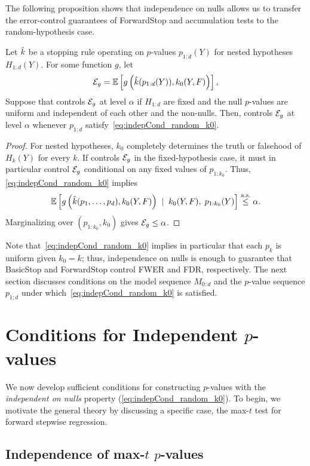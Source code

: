\documentclass{article}
\begin{document}
The following proposition shows that independence on nulls allows us to transfer the error-control guarantees of ForwardStop and accumulation tests to the random-hypothesis case.
\begin{proposition}
  Let $\hk$ be a stopping rule operating on $p$-values $p_{1:d}(Y)$ for nested hypotheses $H_{1:d}(Y)$. For some function $g$, let
  \[
  \mathcal{E}_g = \mathbb{E}\left[ g\left(\hat{k}(p_{1:d}(Y)), k_0(Y, F)\right)\right],
  \]
  Suppose that \smash{$\hk$} controls $\mathcal{E}_g$ at level $\alpha$ if $H_{1:d}$ are fixed and the null $p$-values are uniform and independent of each other and the non-nulls. Then, \smash{$\hk$} controls $\mathcal{E}_g$ at level $\alpha$ whenever $p_{1:d}$ satisfy~\eqref{eq:indepCond_random_k0}.
\end{proposition}
\begin{proof}
    For nested hypotheses, $k_0$ completely determines the truth or falsehood of $H_k(Y)$ for every $k$. If \smash{$\hk$} controls $\mathcal{E}_g$ in the 
fixed-hypothesis case, it must in particular control $\mathcal{E}_g$ conditional on any fixed values of $p_{1:k_0}$. Thus, \eqref{eq:indepCond_random_k0} implies
  \[
  \mathbb{E}\left[ g\left(\hat{k}(p_1,\ldots,p_d), k_0(Y, F)\right) \;\mid\;
      k_0(Y, F), \; p_{1:k_0}(Y)\right] \overset{\textrm{a.s.}}{\leq} \alpha.
  \]
  Marginalizing over $(p_{1:k_0},k_0)$ gives $\mathcal{E}_g\leq \alpha$.
\end{proof}

Note that~\eqref{eq:indepCond_random_k0} implies in particular that each $p_k$ is uniform given $k_0=k$; thus, independence on nulls is enough to guarantee that BasicStop and ForwardStop control FWER and FDR, respectively. The next section discusses conditions on the model sequence $M_{0:d}$ and the $p$-value sequence $p_{1:d}$ under which~\eqref{eq:indepCond_random_k0} is satisfied.

\section{Conditions for Independent $p$-values}\label{sec:pValsIndep}

We now develop sufficient conditions for constructing $p$-values with the {\it independent on nulls} property (\ref{eq:indepCond_random_k0}). To begin, we motivate the general theory by discussing a specific case, the max-$t$ test for forward stepwise regression.

\subsection{Independence of max-$t$ $p$-values}
\end{document}
